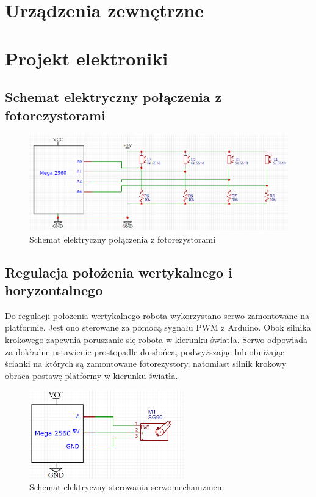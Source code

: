 \documentclass[10pt, a4paper]{article}
\begin{document}
\section{Urządzenia zewnętrzne}


\section{Projekt elektroniki}
	\subsection{Schemat elektryczny połączenia z fotorezystorami}
	\begin{figure}[H]
		\centering
		\includegraphics[width=1\textwidth]{figures/fotorezystory.png}
		\caption{Schemat elektryczny połączenia z fotorezystorami}
		\label{fig:Schemat foto}
	\end{figure}
	
\subsection{Regulacja położenia wertykalnego i horyzontalnego}
Do regulacji położenia wertykalnego robota wykorzystano serwo zamontowane na platformie. Jest ono sterowane za pomocą sygnału PWM z Arduino. Obok silnika krokowego zapewnia poruszanie się robota w kierunku światła. Serwo odpowiada za dokładne ustawienie prostopadle do słońca, podwyższając lub obniżając ścianki na których są zamontowane fotorezystory, natomiast silnik krokowy obraca postawę platformy w kierunku światła.

\begin{figure}[H]
	\centering
	\includegraphics[width=0.6\textwidth]{figures/servo.png}
	\caption{Schemat elektryczny sterowania serwomechanizmem}
	\label{fig:servo}
\end{figure}
\end{document}
